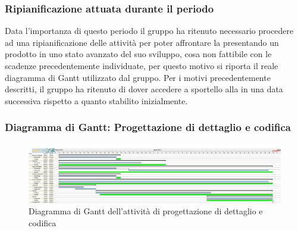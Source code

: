 \newpage
\subsubsection{Ripianificazione attuata durante il periodo} \label{RipianificazionePDettaglio}
Data l'importanza di questo periodo il gruppo ha ritenuto necessario procedere ad una ripianificazione delle attività per poter affrontare la  presentando un prodotto in uno stato avanzato del suo sviluppo, cosa non fattibile con le scadenze precedentemente individuate, per questo motivo si riporta il reale diagramma di Gantt utilizzato dal gruppo. Per i motivi precedentemente descritti, il gruppo ha ritenuto di dover accedere a sportello alla  in una data successiva rispetto a quanto stabilito inizialmente.
\subsubsection{Diagramma di Gantt: Progettazione di dettaglio e codifica} \label{GanttPDettaglio}
\begin{figure}[ht]
    \centering
    \includegraphics[width=\textwidth]{Immagini/GanttProgettazioneDiDettaglioECodifica}
    \caption{Diagramma di Gantt dell'attività di progettazione di dettaglio e codifica}
\end{figure}